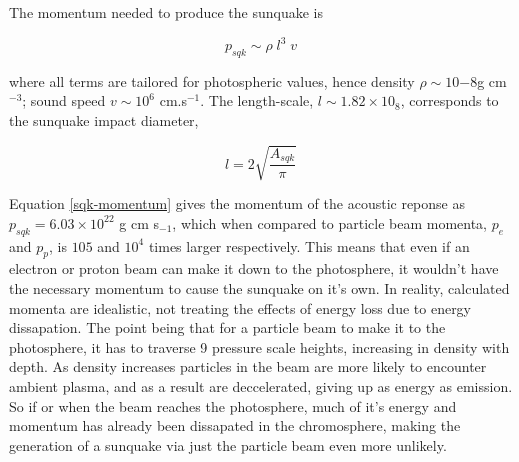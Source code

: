 \documentclass[11pt]{article}
\begin{document}
The momentum needed to produce the sunquake is

\begin{equation}
p_{sqk}\sim \rho \; l^{3} \; v
\end{equation}\label{sqk-momentum} 

where all terms are tailored for photospheric values, hence density $\rho \sim 10{-8}$g cm$^{-3}$; sound speed $v \sim 10^{6}$ cm.s$^{-1}$. The length-scale, $l \sim  1.82{\times}10_{8}$, corresponds to the sunquake impact diameter, 

\begin{equation}
l = 2\sqrt{\frac{A_{sqk}}{\pi}}
\end{equation}\label{lengthscale}

Equation \ref{sqk-momentum} gives the momentum of the acoustic reponse as $p_{sqk} = 6.03{\times}10^{22}$ g cm s$_{-1}$, which when compared to particle beam momenta, $p_e$ and $p_p$, is $10{5}$ and $10^{4}$ times larger respectively. This means that even if an electron or proton beam can make it down to the photosphere, it wouldn't have the necessary momentum to cause the sunquake on it's own. In reality, calculated momenta are idealistic, not treating the effects of energy loss due to energy dissapation. The point being that for a particle beam to make it to the photosphere, it has to traverse 9 pressure scale heights, increasing in density with depth. As density increases particles in the beam are more likely to encounter ambient plasma, and as a result are deccelerated, giving up as energy as emission. So if or when the beam reaches the photosphere, much of it's energy and momentum has already been dissapated in the chromosphere, making the generation of a sunquake via just the particle beam even more unlikely.
\end{document}
